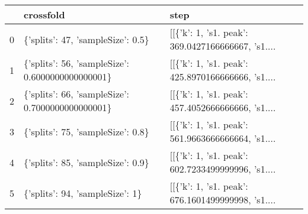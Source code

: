 \begin{tabular}{lll}
\toprule
{} &                                         crossfold &                                               step \\
\midrule
0 &                 \{'splits': 47, 'sampleSize': 0.5\} &  [[\{'k': 1, 's1. peak': 369.0427166666667, 's1.... \\
1 &  \{'splits': 56, 'sampleSize': 0.6000000000000001\} &  [[\{'k': 1, 's1. peak': 425.8970166666666, 's1.... \\
2 &  \{'splits': 66, 'sampleSize': 0.7000000000000001\} &  [[\{'k': 1, 's1. peak': 457.4052666666666, 's1.... \\
3 &                 \{'splits': 75, 'sampleSize': 0.8\} &  [[\{'k': 1, 's1. peak': 561.9663666666664, 's1.... \\
4 &                 \{'splits': 85, 'sampleSize': 0.9\} &  [[\{'k': 1, 's1. peak': 602.7233499999996, 's1.... \\
5 &                   \{'splits': 94, 'sampleSize': 1\} &  [[\{'k': 1, 's1. peak': 676.1601499999998, 's1.... \\
\bottomrule
\end{tabular}
